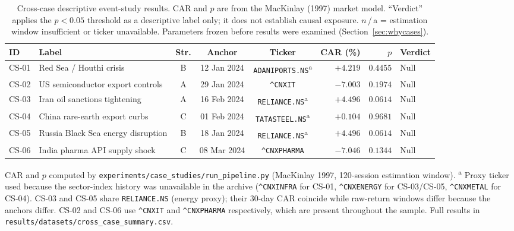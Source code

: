 \documentclass[10pt,a4paper,twocolumn]{article}
\newcommand{\CAR}{\mathrm{CAR}}
\begin{document}
\begin{table}[t]
\centering
\caption{Cross-case descriptive event-study results. CAR and $p$ are from the MacKinlay (1997) market model. ``Verdict'' applies the $p < 0.05$ threshold as a descriptive label only; it does not establish causal exposure. $n$\,/\,a = estimation window insufficient or ticker unavailable. Parameters frozen before results were examined (Section~\ref{sec:whycases}).}
\label{tab:crosscase}
\small
\begin{tabular}{llcccrrl}
\toprule
\textbf{ID} & \textbf{Label} & \textbf{Str.} & \textbf{Anchor} & \textbf{Ticker} & \textbf{CAR (\%)} & \textbf{$p$} & \textbf{Verdict} \\
\midrule
CS-01 & Red Sea / Houthi crisis           & B & 12 Jan 2024 & \texttt{ADANIPORTS.NS}\textsuperscript{a}  & $+4.219$ & $0.4455$ & Null \\
CS-02 & US semiconductor export controls  & A & 29 Jan 2024 & \texttt{\^{}CNXIT}     & $-7.003$ & $0.1974$ & Null \\
CS-03 & Iran oil sanctions tightening     & A & 16 Feb 2024 & \texttt{RELIANCE.NS}\textsuperscript{a}   & $+4.496$ & $0.0614$ & Null \\
CS-04 & China rare-earth export curbs     & C & 01 Feb 2024 & \texttt{TATASTEEL.NS}\textsuperscript{a}  & $+0.104$ & $0.9681$ & Null \\
CS-05 & Russia Black Sea energy disruption & B & 18 Jan 2024 & \texttt{RELIANCE.NS}\textsuperscript{a}   & $+4.496$ & $0.0614$ & Null \\
CS-06 & India pharma API supply shock     & C & 08 Mar 2024 & \texttt{\^{}CNXPHARMA} & $-7.046$ & $0.1344$ & Null \\
\bottomrule
\end{tabular}

\smallskip
\footnotesize CAR and $p$ computed by \texttt{experiments/case\_studies/run\_pipeline.py} (MacKinlay 1997,
120-session estimation window).
\textsuperscript{a} Proxy ticker used because the sector-index history was unavailable in the archive
(\texttt{\^{}CNXINFRA} for CS-01, \texttt{\^{}CNXENERGY} for CS-03/CS-05, \texttt{\^{}CNXMETAL} for CS-04).
CS-03 and CS-05 share \texttt{RELIANCE.NS} (energy proxy); their 30-day $\CAR$ coincide
while raw-return windows differ because the anchors differ.
CS-02 and CS-06 use \texttt{\^{}CNXIT} and \texttt{\^{}CNXPHARMA} respectively,
which are present throughout the sample.
Full results in \texttt{results/datasets/cross\_case\_summary.csv}.
\end{table}
\end{document}
